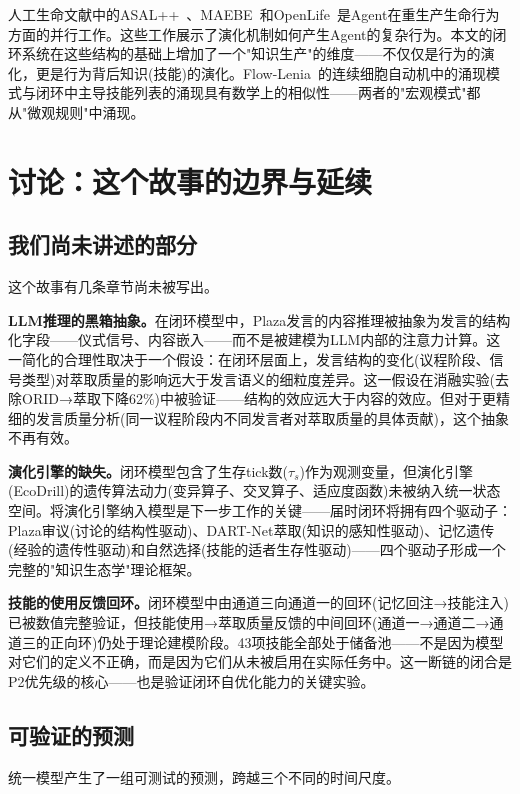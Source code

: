 \documentclass[twocolumn,10.5pt]{ctexart}
\begin{document}
人工生命文献中的ASAL++~\cite{asal2025}、MAEBE~\cite{maebe2025}和OpenLife~\cite{openlife2026}是Agent在重生产生命行为方面的并行工作。这些工作展示了演化机制如何产生Agent的复杂行为。本文的闭环系统在这些结构的基础上增加了一个"知识生产"的维度——不仅仅是行为的演化，更是行为背后知识(技能)的演化。Flow-Lenia~\cite{flowlenia2025}的连续细胞自动机中的涌现模式与闭环中主导技能列表的涌现具有数学上的相似性——两者的"宏观模式"都从"微观规则"中涌现。

\section{讨论：这个故事的边界与延续}

\subsection{我们尚未讲述的部分}

这个故事有几条章节尚未被写出。

\textbf{LLM推理的黑箱抽象。}在闭环模型中，Plaza发言的内容推理被抽象为发言的结构化字段——仪式信号、内容嵌入——而不是被建模为LLM内部的注意力计算。这一简化的合理性取决于一个假设：在闭环层面上，发言结构的变化(议程阶段、信号类型)对萃取质量的影响远大于发言语义的细粒度差异。这一假设在消融实验(去除ORID→萃取下降62\%)中被验证——结构的效应远大于内容的效应。但对于更精细的发言质量分析(同一议程阶段内不同发言者对萃取质量的具体贡献)，这个抽象不再有效。

\textbf{演化引擎的缺失。}闭环模型包含了生存tick数($\tau_s$)作为观测变量，但演化引擎(EcoDrill)的遗传算法动力(变异算子、交叉算子、适应度函数)未被纳入统一状态空间。将演化引擎纳入模型是下一步工作的关键——届时闭环将拥有四个驱动子：Plaza审议(讨论的结构性驱动)、DART-Net萃取(知识的感知性驱动)、记忆遗传(经验的遗传性驱动)和自然选择(技能的适者生存性驱动)——四个驱动子形成一个完整的"知识生态学"理论框架。

\textbf{技能的使用反馈回环。}闭环模型中由通道三向通道一的回环(记忆回注→技能注入)已被数值完整验证，但技能使用→萃取质量反馈的中间回环(通道一→通道二→通道三的正向环)仍处于理论建模阶段。43项技能全部处于储备池——不是因为模型对它们的定义不正确，而是因为它们从未被启用在实际任务中。这一断链的闭合是P2优先级的核心——也是验证闭环自优化能力的关键实验。

\subsection{可验证的预测}

统一模型产生了一组可测试的预测，跨越三个不同的时间尺度。
\end{document}

